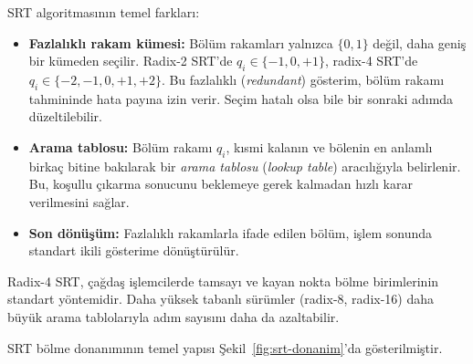 SRT algoritmasının temel farkları:
\begin{itemize}[nosep]
    \item \textbf{Fazlalıklı rakam kümesi:} Bölüm rakamları yalnızca $\{0, 1\}$ değil, daha geniş bir kümeden seçilir. Radix-2 SRT'de $q_i \in \{-1, 0, +1\}$, radix-4 SRT'de $q_i \in \{-2, -1, 0, +1, +2\}$. Bu fazlalıklı (\emph{redundant}) gösterim, bölüm rakamı tahmininde hata payına izin verir. Seçim hatalı olsa bile bir sonraki adımda düzeltilebilir.
    \item \textbf{Arama tablosu:} Bölüm rakamı $q_i$, kısmi kalanın ve bölenin en anlamlı birkaç bitine bakılarak bir \emph{arama tablosu} (\emph{lookup table}) aracılığıyla belirlenir. Bu, koşullu çıkarma sonucunu beklemeye gerek kalmadan hızlı karar verilmesini sağlar.
    \item \textbf{Son dönüşüm:} Fazlalıklı rakamlarla ifade edilen bölüm, işlem sonunda standart ikili gösterime dönüştürülür.
\end{itemize}

Radix-4 SRT, çağdaş işlemcilerde tamsayı ve kayan nokta bölme birimlerinin standart yöntemidir. Daha yüksek tabanlı sürümler (radix-8, radix-16) daha büyük arama tablolarıyla adım sayısını daha da azaltabilir.

SRT bölme donanımının temel yapısı Şekil~\ref{fig:srt-donanim}'da gösterilmiştir.


